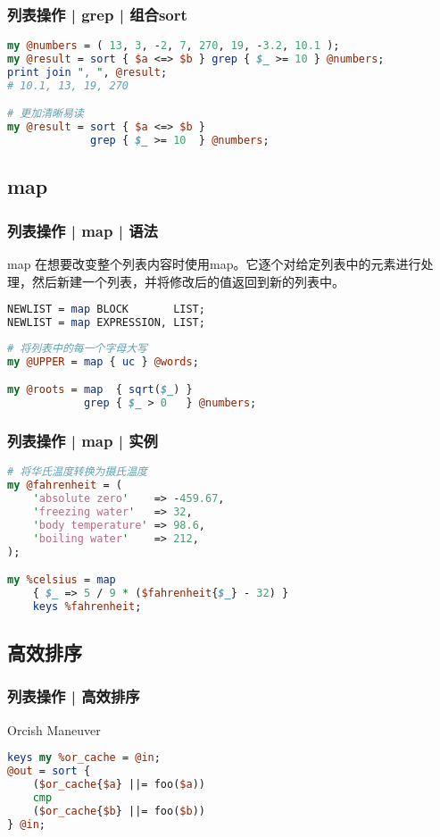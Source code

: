 \begin{frame}[fragile]
  \frametitle{列表操作 | grep | 组合sort}
\begin{lstlisting}[language=Perl]
my @numbers = ( 13, 3, -2, 7, 270, 19, -3.2, 10.1 );
my @result = sort { $a <=> $b } grep { $_ >= 10 } @numbers;
print join ", ", @result;
# 10.1, 13, 19, 270

# 更加清晰易读
my @result = sort { $a <=> $b }
             grep { $_ >= 10  } @numbers;
\end{lstlisting}
\end{frame}

\subsection{map}
\begin{frame}[fragile]
  \frametitle{列表操作 | map | \alert{语法}}
  \begin{block}{map}
在想要改变整个列表内容时使用map。它逐个对给定列表中的元素进行处理，然后新建一个列表，并将修改后的值返回到新的列表中。 
  \end{block}
\begin{lstlisting}[language=Perl]
NEWLIST = map BLOCK       LIST;
NEWLIST = map EXPRESSION, LIST;
\end{lstlisting}
\pause
\begin{lstlisting}[language=Perl]
# 将列表中的每一个字母大写
my @UPPER = map { uc } @words;

my @roots = map  { sqrt($_) }
            grep { $_ > 0   } @numbers;
\end{lstlisting}
\end{frame}

\begin{frame}[fragile]
  \frametitle{列表操作 | map | 实例}
\begin{lstlisting}[language=Perl]
# 将华氏温度转换为摄氏温度
my @fahrenheit = (
    'absolute zero'    => -459.67,
    'freezing water'   => 32,
    'body temperature' => 98.6,
    'boiling water'    => 212,
);

my %celsius = map 
    { $_ => 5 / 9 * ($fahrenheit{$_} - 32) }
    keys %fahrenheit;
\end{lstlisting}
\end{frame}

\subsection{高效排序}
\begin{frame}[fragile]
  \frametitle{列表操作 | 高效排序}
  \begin{block}{Orcish Maneuver}
\begin{lstlisting}[language=Perl]
keys my %or_cache = @in;
@out = sort {
    ($or_cache{$a} ||= foo($a))
    cmp
    ($or_cache{$b} ||= foo($b))
} @in;
\end{lstlisting}
  \end{block}
\end{frame}

